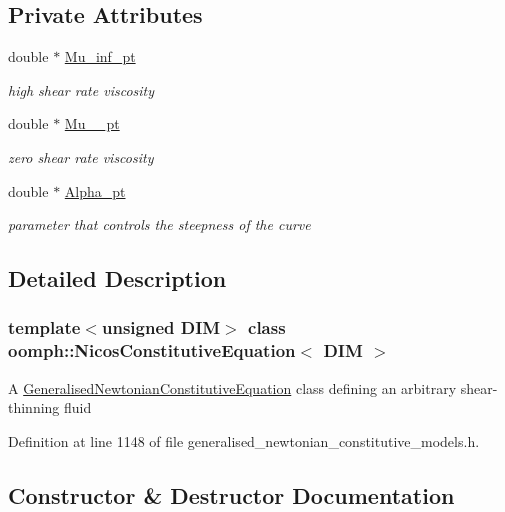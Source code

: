 \subsection*{Private Attributes}
\begin{DoxyCompactItemize}
\item 
double $\ast$ \hyperlink{classoomph_1_1NicosConstitutiveEquation_ab74dee7f73e8b290c4ba251f72d17468}{Mu\+\_\+inf\+\_\+pt}
\begin{DoxyCompactList}\small\item\em high shear rate viscosity \end{DoxyCompactList}\item 
double $\ast$ \hyperlink{classoomph_1_1NicosConstitutiveEquation_a47ddb3294d11f24f639796b1d8e60eac}{Mu\+\_\+\_\+pt}
\begin{DoxyCompactList}\small\item\em zero shear rate viscosity \end{DoxyCompactList}\item 
double $\ast$ \hyperlink{classoomph_1_1NicosConstitutiveEquation_aa9b410ec3ce0abdc60a86b13da0f7e95}{Alpha\+\_\+pt}
\begin{DoxyCompactList}\small\item\em parameter that controls the steepness of the curve \end{DoxyCompactList}\end{DoxyCompactItemize}


\subsection{Detailed Description}
\subsubsection*{template$<$unsigned D\+IM$>$\newline
class oomph\+::\+Nicos\+Constitutive\+Equation$<$ D\+I\+M $>$}

A \hyperlink{classoomph_1_1GeneralisedNewtonianConstitutiveEquation}{Generalised\+Newtonian\+Constitutive\+Equation} class defining an arbitrary shear-\/thinning fluid 

Definition at line 1148 of file generalised\+\_\+newtonian\+\_\+constitutive\+\_\+models.\+h.



\subsection{Constructor \& Destructor Documentation}
\mbox{\label{classoomph_1_1NicosConstitutiveEquation_a5fcbd52036d1d075ce4e9a0515276a29}} 
